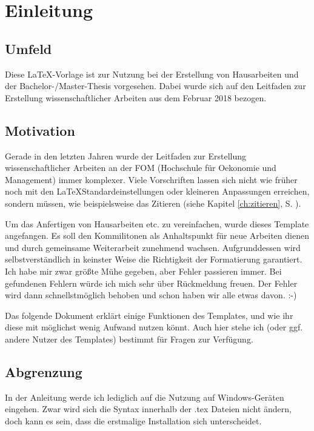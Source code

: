 \chapter{Einleitung}
\label{ch:einleitung}

\section{Umfeld}
Diese \LaTeX -Vorlage ist zur Nutzung bei der Erstellung von Hausarbeiten und der Bachelor-/Master-Thesis vorgesehen. Dabei wurde sich auf den Leitfaden zur Erstellung wissenschaftlicher Arbeiten aus dem Februar 2018 bezogen.\autocite[Vgl.][]{leitfaden}

\section{Motivation}
Gerade in den letzten Jahren wurde der Leitfaden zur Erstellung wissenschaftlicher Arbeiten an der FOM (Hochschule für Oekonomie und Management) immer komplexer. Viele Vorschriften lassen sich nicht wie früher noch mit den \LaTeX\-Standardeinstellungen oder kleineren Anpassungen erreichen, sondern müssen, wie beispielsweise das Zitieren (siehe Kapitel \ref{ch:zitieren}, S. \pageref{ch:zitieren}).

Um das Anfertigen von Hausarbeiten etc. zu vereinfachen, wurde dieses Template angefangen. Es soll den Kommilitonen als Anhaltspunkt für neue Arbeiten dienen und durch gemeinsame Weiterarbeit zunehmend wachsen. Aufgrunddessen wird selbstverständlich in keinster Weise die Richtigkeit der Formatierung garantiert. Ich habe mir zwar größte Mühe gegeben, aber Fehler passieren immer. Bei gefundenen Fehlern würde ich mich sehr über Rückmeldung freuen. Der Fehler wird dann schnellstmöglich behoben und schon haben wir alle etwas davon. :-)

Das folgende Dokument erklärt einige Funktionen des Templates, und wie ihr diese mit möglichst wenig Aufwand nutzen könnt. Auch hier stehe ich (oder ggf. andere Nutzer des Templates) bestimmt für Fragen zur Verfügung.

\section{Abgrenzung}
In der Anleitung werde ich lediglich auf die Nutzung auf Windows-Geräten eingehen. Zwar wird sich die Syntax innerhalb der .tex Dateien nicht ändern, doch kann es sein, dass die erstmalige Installation sich unterscheidet.